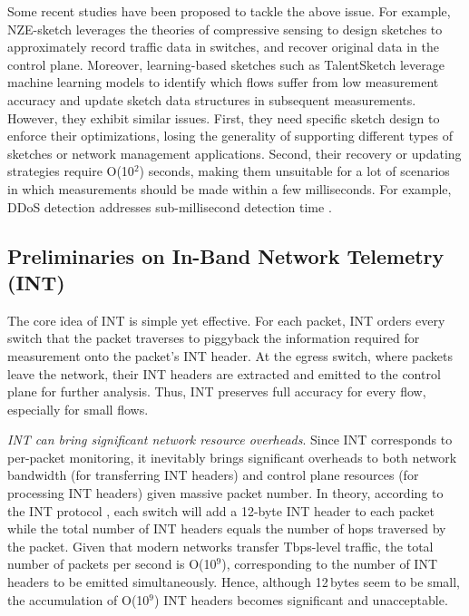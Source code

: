 Some recent studies have been proposed to tackle the above issue. For example, NZE-sketch \cite{huang2021toward} leverages the theories of compressive sensing to design sketches to approximately record traffic data in switches, and recover original data in the control plane. Moreover, learning-based sketches such as TalentSketch \cite{li2024learning} leverage machine learning models to identify which flows suffer from low measurement accuracy and update sketch data structures in subsequent measurements. However, they exhibit similar issues. First, they need specific sketch design to enforce their optimizations, losing the generality of supporting different types of sketches or network management applications. Second, their recovery or updating strategies require O(10$^2$) seconds, making them unsuitable for a lot of scenarios in which measurements should be made within a few milliseconds. For example, DDoS detection addresses sub-millisecond detection time \cite{liu2021jaqen}. 

\subsection{Preliminaries on In-Band Network Telemetry (INT)}

The core idea of INT is simple yet effective. For each packet, INT orders every switch that the packet traverses to piggyback the information required for measurement onto the packet's INT header. At the egress switch, where packets leave the network, their INT headers are extracted and emitted to the control plane for further analysis. Thus, INT preserves full accuracy for every flow, especially for small flows. 

 \emph{INT can bring significant network resource overheads}. Since INT corresponds to per-packet monitoring, it inevitably brings significant overheads to both network bandwidth (for transferring INT headers) and control plane resources (for processing INT headers) given massive packet number. In theory, according to the INT protocol \cite{int}, each switch will add a 12-byte INT header to each packet while the total number of INT headers equals the number of hops traversed by the packet. Given that modern networks transfer Tbps-level traffic, the total number of packets per second is O(10$^9$), corresponding to the number of INT headers to be emitted simultaneously. Hence, although 12\,bytes seem to be small, the accumulation of O(10$^9$) INT headers becomes significant and unacceptable. 

